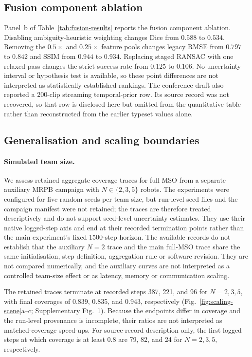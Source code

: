 \documentclass[11pt]{article}
\begin{document}
\subsection{Fusion component ablation} \label{sec:fusion-component-results}

Panel~b of Table~\ref{tab:fusion-results} reports the fusion component ablation. Disabling ambiguity-heuristic weighting changes Dice from $0.588$ to $0.534$. Removing the $0.5{\times}$ and $0.25{\times}$ feature pools changes legacy RMSE from $0.797$ to $0.842$ and SSIM from $0.944$ to $0.934$. Replacing staged RANSAC with one relaxed pass changes the strict success rate from $0.125$ to $0.106$. No uncertainty interval or hypothesis test is available, so these point differences are not interpreted as statistically established rankings.
The conference draft also reported a 200-clip streaming temporal-prior row. Its source record was not recovered, so that row is disclosed here but omitted from the quantitative table rather than reconstructed from the earlier typeset values alone.

\subsection{Generalisation and scaling boundaries} \label{app:scaling}

\paragraph{Simulated team size.}
We assess retained aggregate coverage traces for full MSO from a separate auxiliary MRPB campaign with $N\!\in\!\{2,3,5\}$ robots. The experiments were configured for five random seeds per team size, but run-level seed files and the campaign manifest were not retained; the traces are therefore treated descriptively and do not support seed-level uncertainty estimates. They use their native logged-step axis and end at their recorded termination points rather than the main experiment's fixed 1500-step horizon. The available records do not establish that the auxiliary $N{=}2$ trace and the main full-MSO trace share the same initialisation, step definition, aggregation rule or software revision. They are not compared numerically, and the auxiliary curves are not interpreted as a controlled team-size effect or as latency, memory or communication scaling.

The retained traces terminate at recorded steps 387, 221, and 96 for $N{=}2,3,5$, with final coverages of 0.839, 0.835, and 0.943, respectively (Fig.~\ref{fig:scaling-scene}a--c; Supplementary Fig.~1). Because the endpoints differ in coverage and the run-level provenance is incomplete, their ratios are not interpreted as matched-coverage speed-ups. For source-record description only, the first logged steps at which coverage is at least 0.8 are 79, 82, and 24 for $N{=}2,3,5$, respectively.
\end{document}

